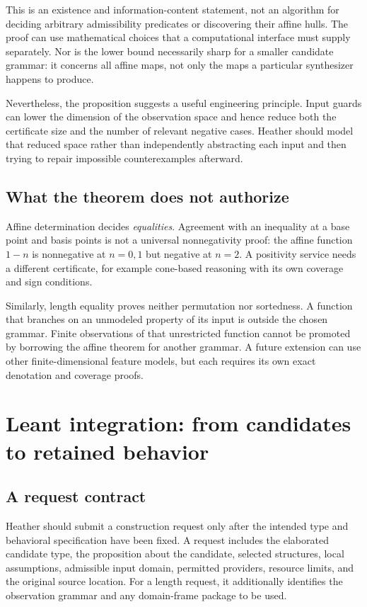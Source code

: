 \documentclass[11pt,letterpaper]{article}
\theoremstyle{definition}\newtheorem{definition}[theorem]{Definition}
\theoremstyle{remark}\newtheorem{remark}[theorem]{Remark}
\begin{document}
This is an existence and information-content statement, not an algorithm for
deciding arbitrary admissibility predicates or discovering their affine hulls.
The proof can use mathematical choices that a computational interface must
supply separately. Nor is the lower bound necessarily sharp for a smaller
candidate grammar: it concerns all affine maps, not only the maps a particular
synthesizer happens to produce.

Nevertheless, the proposition suggests a useful engineering principle. Input
guards can lower the dimension of the observation space and hence reduce both
the certificate size and the number of relevant negative cases. Heather should
model that reduced space rather than independently abstracting each input and
then trying to repair impossible counterexamples afterward.

\subsection{What the theorem does not authorize}
Affine determination decides \emph{equalities}. Agreement with an inequality
at a base point and basis points is not a universal nonnegativity proof: the
affine function $1-n$ is nonnegative at $n=0,1$ but negative at $n=2$.
A positivity service needs a different certificate, for example cone-based
reasoning with its own coverage and sign conditions.

Similarly, length equality proves neither permutation nor sortedness. A
function that branches on an unmodeled property of its input is outside the
chosen grammar. Finite observations of that unrestricted function cannot be
promoted by borrowing the affine theorem for another grammar. A future
extension can use other finite-dimensional feature models, but each requires
its own exact denotation and coverage proofs.

\section{Leant integration: from candidates to retained behavior}\label{sec:leant}

\subsection{A request contract}
Heather should submit a construction request only after the intended type and
behavioral specification have been fixed. A request includes the elaborated
candidate type, the proposition about the candidate, selected structures,
local assumptions, admissible input domain, permitted providers, resource
limits, and the original source location. For a length request, it additionally
identifies the observation grammar and any domain-frame package to be used.
\end{document}
